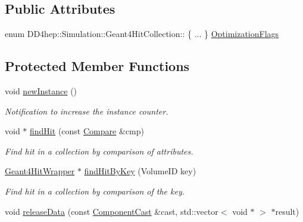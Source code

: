 \subsection*{Public Attributes}
\begin{DoxyCompactItemize}
\item 
enum DD4hep::Simulation::Geant4HitCollection:: \{ ... \}  \hyperlink{class_d_d4hep_1_1_simulation_1_1_geant4_hit_collection_a7f71d7699e398712740081192f4dd846}{OptimizationFlags}
\end{DoxyCompactItemize}
\subsection*{Protected Member Functions}
\begin{DoxyCompactItemize}
\item 
void \hyperlink{class_d_d4hep_1_1_simulation_1_1_geant4_hit_collection_abd59378fa4d12c151299841d340fd63e}{newInstance} ()
\begin{DoxyCompactList}\small\item\em Notification to increase the instance counter. \item\end{DoxyCompactList}\item 
void $\ast$ \hyperlink{class_d_d4hep_1_1_simulation_1_1_geant4_hit_collection_a4c854c0d590b4d453b2863933dfa31a1}{findHit} (const \hyperlink{class_d_d4hep_1_1_simulation_1_1_geant4_hit_collection_1_1_compare}{Compare} \&cmp)
\begin{DoxyCompactList}\small\item\em Find hit in a collection by comparison of attributes. \item\end{DoxyCompactList}\item 
\hyperlink{class_d_d4hep_1_1_simulation_1_1_geant4_hit_wrapper}{Geant4HitWrapper} $\ast$ \hyperlink{class_d_d4hep_1_1_simulation_1_1_geant4_hit_collection_a912bb8ef9922058b0dbb3dbc5ee116bc}{findHitByKey} (VolumeID key)
\begin{DoxyCompactList}\small\item\em Find hit in a collection by comparison of the key. \item\end{DoxyCompactList}\item 
void \hyperlink{class_d_d4hep_1_1_simulation_1_1_geant4_hit_collection_a0bd80f5c59a487fef77a04020c9c24a2}{releaseData} (const \hyperlink{class_d_d4hep_1_1_component_cast}{ComponentCast} \&cast, std::vector$<$ void $\ast$ $>$ $\ast$result)

\end{DoxyCompactItemize}
